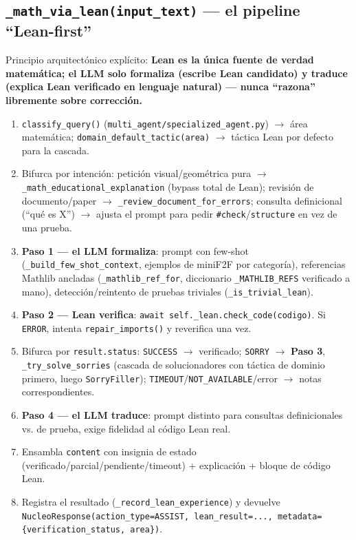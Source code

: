 \documentclass[11pt,a4paper]{report}
\newcommand{\code}[1]{\texttt{#1}}
\begin{document}
\subsection{\code{\_math_via_lean(input_text)} --- el pipeline ``Lean-first''}
\label{sec:lean-first}
Principio arquitect\'onico expl\'icito: \textbf{Lean es la \'unica fuente de verdad matem\'atica; el LLM solo formaliza (escribe Lean candidato) y traduce (explica Lean verificado en lenguaje natural) --- nunca ``razona'' libremente sobre correcci\'on.}
\begin{enumerate}
  \item \code{classify_query()} (\code{multi_agent/specialized_agent.py}) $\to$ \'area matem\'atica; \code{domain_default_tactic(area)} $\to$ t\'actica Lean por defecto para la cascada.
  \item Bifurca por intenci\'on: petici\'on visual/geom\'etrica pura $\to$ \code{\_math_educational_explanation} (bypass total de Lean); revisi\'on de documento/paper $\to$ \code{\_review_document_for_errors}; consulta definicional (``qu\'e es X'') $\to$ ajusta el prompt para pedir \code{\#check}/\code{structure} en vez de una prueba.
  \item \textbf{Paso 1 --- el LLM formaliza}: prompt con few-shot (\code{\_build_few_shot_context}, ejemplos de miniF2F por categor\'ia), referencias Mathlib ancladas (\code{\_mathlib_ref_for}, diccionario \code{\_MATHLIB_REFS} verificado a mano), detecci\'on/reintento de pruebas triviales (\code{\_is_trivial_lean}).
  \item \textbf{Paso 2 --- Lean verifica}: \code{await self.\_lean.check_code(codigo)}. Si \code{ERROR}, intenta \code{repair_imports()} y reverifica una vez.
  \item Bifurca por \code{result.status}: \code{SUCCESS} $\to$ verificado; \code{SORRY} $\to$ \textbf{Paso 3}, \code{\_try_solve_sorries} (cascada de solucionadores con t\'actica de dominio primero, luego \code{SorryFiller}); \code{TIMEOUT}/\code{NOT_AVAILABLE}/error $\to$ notas correspondientes.
  \item \textbf{Paso 4 --- el LLM traduce}: prompt distinto para consultas definicionales vs. de prueba, exige fidelidad al c\'odigo Lean real.
  \item Ensambla \code{content} con insignia de estado (verificado/parcial/pendiente/timeout) + explicaci\'on + bloque de c\'odigo Lean.
  \item Registra el resultado (\code{\_record_lean_experience}) y devuelve \code{NucleoResponse(action_type=ASSIST, lean_result=..., metadata=\{verification_status, area\})}.
\end{enumerate}
\end{document}
